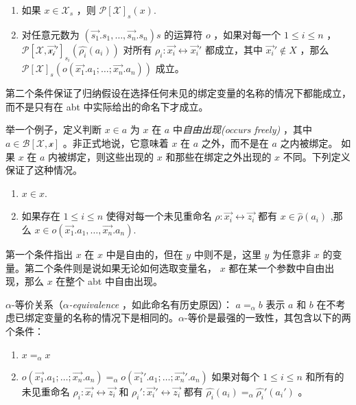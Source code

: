 \begin{enumerate}
\def\labelenumi{\arabic{enumi}.}
\item
  如果 \(x \in \mathcal{X}_s\) ，则 \(\mathcal{P[X]}_s(x)\).
\item
  对任意元数为 \((\vec{s_1}.s_1,\dots,\vec{s_n}.s_n)s\) 的运算符 \(o\)
  ，如果对每一个 \(1\leq i \leq n\) ，
  \(\mathcal{P[X,\vec{x_i}']}_{s_i}(\hat{\rho_i}(a_i))\) 对所有
  \(\rho_i:\vec{x_i}\leftrightarrow \vec{x_i}'\) 都成立，其中
  \(\vec{x_i}' \notin X\) ，那么
  \(\mathcal{P[X]}_s(o(\vec{x_1}.a_1;\dots;\vec{x_n}.a_n))\) 成立。
\end{enumerate}

第二个条件保证了归纳假设在选择任何未见的绑定变量的名称的情况下都能成立，而不是只有在
abt 中实际给出的命名下才成立。

举一个例子，定义判断 \(x\in a\) 为 \(x\) 在 \(a\)
中\emph{自由出现(occurs freely)} ，其中 \(a\in \mathcal{B[X,x]}\)
。非正式地说，它意味着 \(x\) 在 \(a\) 之外，而不是在 \(a\) 之内被绑定。
如果 \(x\) 在 \(a\) 内被绑定，则这些出现的 \(x\) 和那些在绑定之外出现的
\(x\) 不同。下列定义保证了这种情况。

\begin{enumerate}
\def\labelenumi{\arabic{enumi}.}
\item
  \(x\in x\).
\item
  如果存在 \(1\leq i \leq n\) 使得对每一个未见重命名
  \(\rho:\vec{x_i}\leftrightarrow \vec{z_i}\) 都有
  \(x\in \hat{\rho}(a_i)\) ,那么
  \(x \in o(\vec{x_1}.a_1,\dots,\vec{x_n}.a_n)\).
\end{enumerate}

第一个条件指出 \(x\) 在 \(x\) 中是自由的，但在 \(y\) 中则不是，这里
\(y\) 为任意非 \(x\) 的变量。第二个条件则是说如果无论如何选取变量名，
\(x\) 都在某一个参数中自由出现，那么 \(x\) 在整个 abt 中自由出现。

$\alpha$-等价关系（\emph{$\alpha$-equivalence} ，如此命名有历史原因）：
\(a=_\alpha b\) 表示 \(a\) 和 \(b\)
在不考虑已绑定变量的名称的情况下是相同的。$\alpha$-等价是最强的一致性，其包含以下的两个条件：

\begin{enumerate}
\def\labelenumi{\arabic{enumi}.}
\item
  \(x=_\alpha x\)
\item
  \(o(\vec{x_1}.a_1;\dots;\vec{x_n}.a_n) =_\alpha o(\vec{x_1}'.a_1;\dots;\vec{x_n}'.a_n)\)
  如果对每个 \( 1\leq i\leq n\) 和所有的未见重命名
  \(\rho_i:\vec{x_i}\leftrightarrow\vec{z_i}\) 和
  \(\rho_i':\vec{x_i}'\leftrightarrow\vec{z_i}\) 都有
  \(\hat{\rho_i}(a_i)=_\alpha\hat{\rho_i}'(a_i')\) 。
\end{enumerate}

